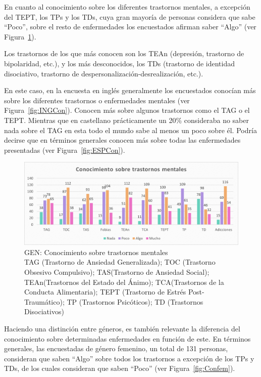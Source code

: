\documentclass[12pt, a4paper,twoside,titlepage]{book}
\begin{document}
En cuanto al conocimiento sobre los diferentes trastornos mentales, a excepción del TEPT, los TPs y los TDs, cuya gran mayoría de personas considera que sabe “Poco”, sobre el resto de enfermedades los encuestados afirman saber “Algo” (ver Figura~\ref{fig:Conocimiento}). 

Los trastornos de los que más conocen son los TEAn (depresión, trastorno de bipolaridad, etc.), y los más desconocidos, los TDs (trastorno de identidad disociativo, trastorno de despersonalización-desrealización, etc.). 

En este caso, en la encuesta en inglés generalmente los encuestados conocían más sobre los diferentes trastornos o enfermedades mentales (ver Figura~\ref{fig:INGCon}). Conocen más sobre algunos trastornos como el TAG o el TEPT. Mientras que en castellano prácticamente un 20\% consideraba no saber nada sobre el TAG en esta todo el mundo sabe al menos un poco sobre él. Podría decirse que en términos generales conocen más sobre todas las enfermedades presentadas (ver Figura~\ref{fig:ESPCon}). 


\begin{figure}
\centering
 \includegraphics[width=1\linewidth]{Imagenes Form GEN/6GENCon}
 \caption{GEN: Conocimiento sobre trastornos mentales\\
 TAG (Trastorno de Ansiedad Generalizada); TOC (Trastorno Obsesivo Compulsivo); TAS(Trastorno de Ansiedad Social); TEAn(Trastornos del Estado del Ánimo); TCA(Trastornos de la Conducta Alimentaria); TEPT (Trastorno de Estrés Post-Traumático); TP (Trastornos Psicóticos); TD (Trastornos Disociativos) }
 \label{fig:Conocimiento}
 \end{figure}


Haciendo una distinción entre géneros, es también relevante la diferencia del conocimiento sobre determinadas enfermedades en función de este. En términos generales, las encuestadas de género femenino, un total de 131 personas, consideran que saben “Algo” sobre todos los trastornos a excepción de los TPs y TDs, de los cuales consideran que saben “Poco” (ver Figura~\ref{fig:Confem}). 
\end{document}
